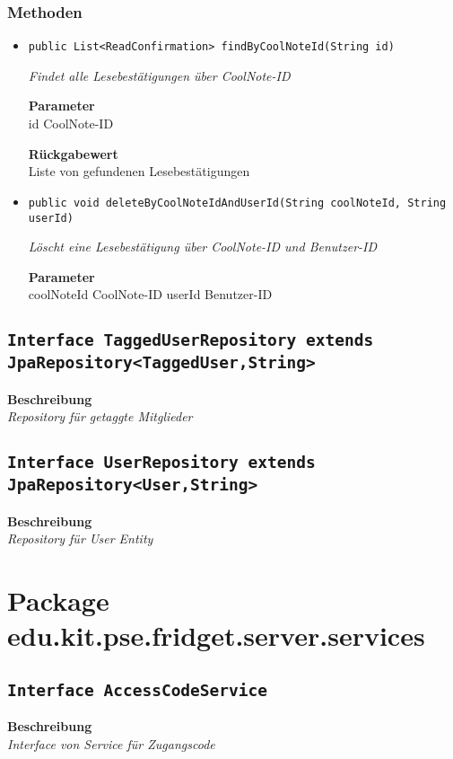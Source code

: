     \subsubsection*{Methoden}
    \begin{itemize}
    	\item{\texttt{public List<ReadConfirmation> findByCoolNoteId(String id)}}
    	
    	\textit{Findet alle Lesebestätigungen über CoolNote-ID}
    	
    	\textbf{Parameter} \\
    	id CoolNote-ID
    	
    	\textbf{Rückgabewert} \\
    	Liste von gefundenen Lesebestätigungen        \item{\texttt{public void deleteByCoolNoteIdAndUserId(String coolNoteId, String userId)}}
    	
    	\textit{Löscht eine Lesebestätigung über CoolNote-ID und Benutzer-ID}
    	
    	\textbf{Parameter} \\
    	coolNoteId CoolNote-ID
    	userId Benutzer-ID
    	
    	
    \end{itemize}
    \subsection{\texttt{Interface TaggedUserRepository extends JpaRepository<TaggedUser,String>}}
    \textbf{Beschreibung} \\
    \textit{Repository für getaggte Mitglieder}
    \subsection{\texttt{Interface UserRepository extends JpaRepository<User,String>}}
    \textbf{Beschreibung} \\
    \textit{Repository für User Entity}
    \section{Package edu.kit.pse.fridget.server.services}
    \subsection{\texttt{Interface AccessCodeService}}
    \textbf{Beschreibung} \\
    \textit{Interface von Service für Zugangscode}
